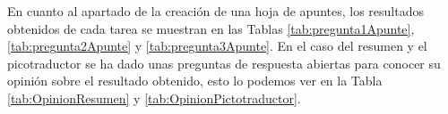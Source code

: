 En cuanto al apartado de la creación de una hoja de apuntes, los resultados obtenidos de cada tarea se muestran en las Tablas \ref{tab:pregunta1Apunte}, \ref{tab:pregunta2Apunte} y \ref{tab:pregunta3Apunte}. En el caso del resumen y el picotraductor se ha dado unas preguntas de respuesta abiertas para conocer su opinión sobre el resultado obtenido, esto lo podemos ver en la Tabla \ref{tab:OpinionResumen} y \ref{tab:OpinionPictotraductor}.

\begin{table}[H]
\end{table}
